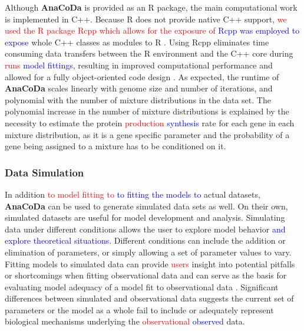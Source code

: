 \documentclass{bioinfo}
\newcommand{\package}{\textbf{AnaCoDa }} %
\begin{document}
Although \package is provided as an R package, the main computational work is implemented in C++.
Because R does not provide native C++ support, \textcolor{red}{we used the R package Rcpp which allows for the exposure of} \textcolor{blue}{Rcpp was employed to expose} whole C++ classes as modules to R \citep{rcpp_package}.
Using Rcpp eliminates time consuming data transfers between the R environment and the C++ core during \textcolor{red}{runs} \textcolor{blue}{model fittings}, resulting in improved computational performance and allowed for a fully object-oriented code design \citep{ood_book}. 
As expected, the runtime of \package scales linearly with genome size and number of iterations, and polynomial with the number of mixture distributions in the data set. 
The polynomial increase in the number of mixture distributions is explained by the necessity to estimate the protein \textcolor{red}{production} \textcolor{blue}{synthesis} rate for each gene in each mixture distribution, as it is a gene specific parameter and the probability of a gene being assigned to a mixture has to be conditioned on it.

\subsubsection*{Data Simulation}
In addition \textcolor{red}{to model fitting to} \textcolor{blue}{to fitting the models to} actual datasets, \package can be used to generate simulated data sets as well.
On their own, simulated datasets are useful for model development and analysis.
Simulating data under different conditions allows the user to explore model behavior \textcolor{blue}{and explore theoretical situations}. 
Different conditions can include the addition or elimination of parameters, or simply allowing a set of parameter values to vary.
Fitting models to simulated data can provide \textcolor{red}{users} insight into potential pitfalls or shortcomings when fitting observational data and can serve as the basis for evaluating model adequacy of a model fit to observational data \citep{gumi2015}.
Significant differences between simulated and observational data suggests the current set of parameters or the model as a whole fail to include or adequately represent biological mechanisms underlying the \textcolor{red}{observational} \textcolor{blue}{observed} data.
 
\end{document}
